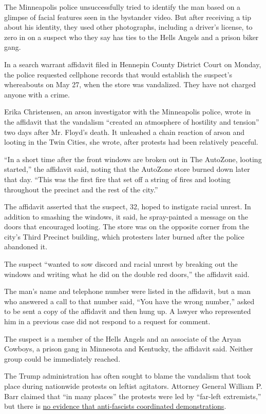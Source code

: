 The Minneapolis police unsuccessfully tried to identify the man based on
a glimpse of facial features seen in the bystander video. But after
receiving a tip about his identity, they used other photographs,
including a driver's license, to zero in on a suspect who they say has
ties to the Hells Angels and a prison biker gang.

In a search warrant affidavit filed in Hennepin County District Court on
Monday, the police requested cellphone records that would establish the
suspect's whereabouts on May 27, when the store was vandalized. They
have not charged anyone with a crime.

Erika Christensen, an arson investigator with the Minneapolis police,
wrote in the affidavit that the vandalism ``created an atmosphere of
hostility and tension'' two days after Mr. Floyd's death. It unleashed a
chain reaction of arson and looting in the Twin Cities, she wrote, after
protests had been relatively peaceful.

``In a short time after the front windows are broken out in The
AutoZone, looting started,'' the affidavit said, noting that the
AutoZone store burned down later that day. ``This was the first fire
that set off a string of fires and looting throughout the precinct and
the rest of the city.''

The affidavit asserted that the suspect, 32, hoped to instigate racial
unrest. In addition to smashing the windows, it said, he spray-painted a
message on the doors that encouraged looting. The store was on the
opposite corner from the city's Third Precinct building, which
protesters later burned after the police abandoned it.

The suspect ``wanted to sow discord and racial unrest by breaking out
the windows and writing what he did on the double red doors,'' the
affidavit said.

The man's name and telephone number were listed in the affidavit, but a
man who answered a call to that number said, ``You have the wrong
number,'' asked to be sent a copy of the affidavit and then hung up. A
lawyer who represented him in a previous case did not respond to a
request for comment.

The suspect is a member of the Hells Angels and an associate of the
Aryan Cowboys, a prison gang in Minnesota and Kentucky, the affidavit
said. Neither group could be immediately reached.

The Trump administration has often sought to blame the vandalism that
took place during nationwide protests on leftist agitators. Attorney
General William P. Barr claimed that ``in many places'' the protests
were led by ``far-left extremists,'' but there is
\href{https://www.nytimes3xbfgragh.onion/2020/06/11/us/antifa-protests-george-floyd.html}{no
evidence that anti-fascists coordinated demonstrations}.

